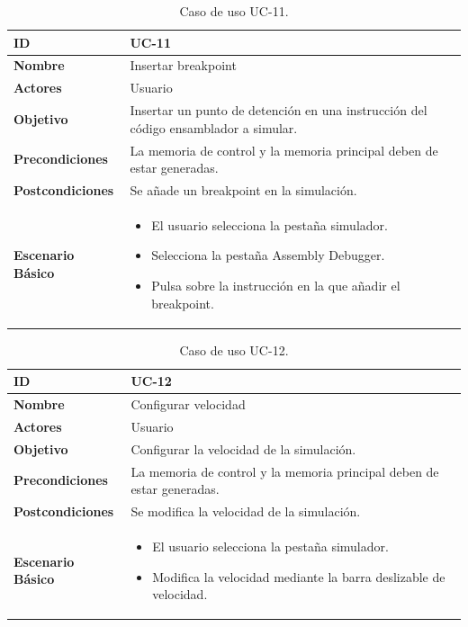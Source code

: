 \begin{center}
\begin{table}[htbp]
\centering
\caption{Caso de uso UC-11.}
\begin{tabular}{@{}p{2.5cm} p{9cm}@{}} 
\toprule
\textbf{ID}	& UC-11  \\
\midrule
\textbf{Nombre} 		& Insertar breakpoint  \\
\midrule
\textbf{Actores} 		&	Usuario  \\
\midrule
\textbf{Objetivo} 	&	Insertar un punto de detención en una instrucción del código ensamblador a simular.	 \\
\midrule
\textbf{Precondiciones}	&	La memoria de control y la memoria principal deben de estar generadas.  \\
\midrule
\textbf{Postcondiciones} 	& Se añade un breakpoint en la simulación.   \\
\midrule
\textbf{Escenario Básico} 	&  \begin{itemize}
\item El usuario selecciona la pestaña simulador.
\item Selecciona la pestaña Assembly Debugger.
\item Pulsa sobre la instrucción en la que añadir el breakpoint.
\end{itemize} \\
\bottomrule
\end{tabular}
\label{tab:uc11}
\end{table}
\end{center}

\begin{center}
\begin{table}[htbp]
\centering
\caption{Caso de uso UC-12.}
\begin{tabular}{@{}p{2.5cm} p{9cm}@{}} 
\toprule
\textbf{ID}	& UC-12  \\
\midrule
\textbf{Nombre} 		& Configurar velocidad  \\
\midrule
\textbf{Actores} 		&	Usuario  \\
\midrule
\textbf{Objetivo} 	&	Configurar la velocidad de la simulación.	 \\
\midrule
\textbf{Precondiciones}	&	La memoria de control y la memoria principal deben de estar generadas.  \\
\midrule
\textbf{Postcondiciones} 	& Se modifica la velocidad de la simulación.   \\
\midrule
\textbf{Escenario Básico} 	&  \begin{itemize}
\item El usuario selecciona la pestaña simulador.
\item Modifica la velocidad mediante la barra deslizable de velocidad.
\end{itemize} \\
\bottomrule
\end{tabular}
\label{tab:uc12}
\end{table}
\end{center}

